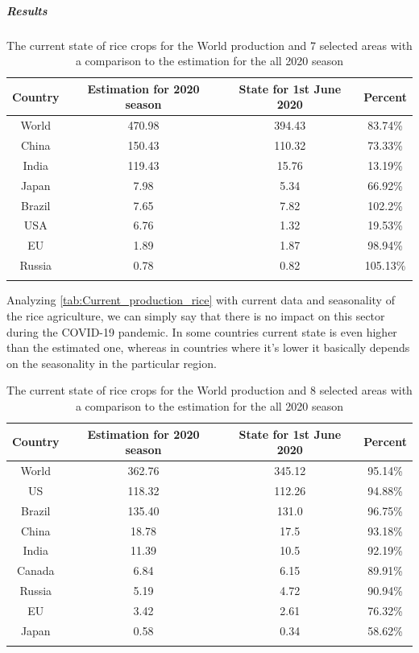 \subparagraph{Results}

\begin{table}[h!]
	\centering
	\begin{tabular}{c c c c} 
		\hline
		Country & Estimation for 2020 season & State for 1st June 2020 & Percent \\ 
		\hline\hline
		World & 470.98 & 394.43 & 83.74\% \\
		China & 150.43 & 110.32 & 73.33\% \\ 
		India & 119.43 & 15.76 & 13.19\% \\
		Japan & 7.98 & 5.34 & 66.92\% \\
		Brazil & 7.65 & 7.82 & 102.2\% \\
		USA & 6.76 & 1.32 & 19.53\%  \\ 
		EU & 1.89 & 1.87 & 98.94\% \\
		Russia & 0.78 & 0.82 & 105.13\% \\
		\hline
		&&& \\
	\end{tabular}
	\caption{The current state of rice crops for the World production and 7 selected areas with a comparison to the estimation for the all 2020 season}
	\label{tab:Current_production_rice}
\end{table}

Analyzing \autoref{tab:Current_production_rice} with current data and seasonality of the rice agriculture, we can simply say that there is no impact on this sector during the COVID-19 pandemic. In some countries current state is even higher than the estimated one, whereas in countries where it's lower it basically depends on the seasonality in the particular region. 

 

\begin{table}[h!]
	\centering
	\begin{tabular}{c c c c} 
 	\hline
 	Country & Estimation for 2020 season & State for 1st June 2020 & Percent \\ 
	 \hline\hline
	 World & 362.76 & 345.12 & 95.14\% \\
	 US & 118.32 & 112.26 & 94.88\% \\ 
	 Brazil & 135.40 & 131.0 & 96.75\% \\
	 China & 18.78 & 17.5 & 93.18\% \\
	 India & 11.39 & 10.5 & 92.19\% \\
	 Canada & 6.84 & 6.15 & 89.91\%  \\ 
	 Russia & 5.19 & 4.72 & 90.94\% \\
	 EU & 3.42 & 2.61 & 76.32\% \\
	 Japan & 0.58 & 0.34 & 58.62\% \\
	 \hline
	 &&& \\
	\end{tabular}
	 \caption{The current state of rice crops for the World production and 8 selected areas with a comparison to the estimation for the all 2020 season}
	 \label{tab:Current_production_soybean}
\end{table}

